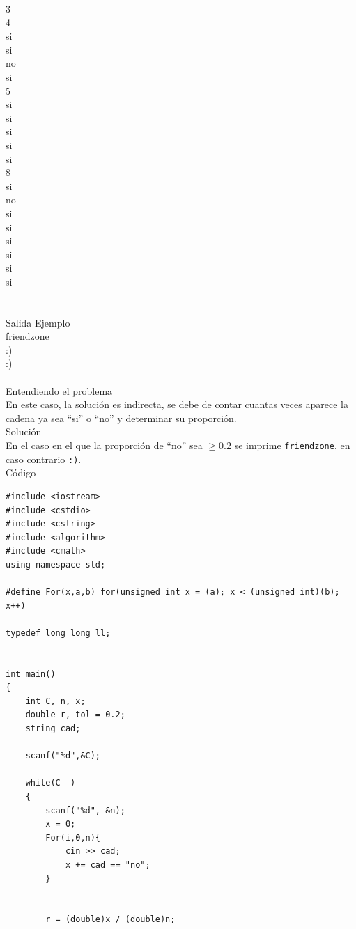 \documentclass[12pt]{article}
\begin{document}
{{{3\\
4\\
si\\
si\\
no\\
si\\
5\\
si\\
si\\
si\\
si\\
si\\
8\\
si\\
no\\
si\\
si\\
si\\
si\\
si\\
si\\
\\
\\
\textrm{\large Salida Ejemplo}
\\
friendzone\\
:)\\
:)\\
\\
\textrm{\large Entendiendo el problema}\\
En este caso, la solución es indirecta, se debe de contar cuantas veces aparece la cadena ya sea ``si'' o ``no'' y determinar su proporción.
\\
\textrm{\large Solución}\\
En el caso en el que la proporción de ``no'' sea $\geq 0{.}2$ se imprime \texttt{friendzone}, en caso contrario \texttt{:)}.
\\
\textrm{\large Código}\\
\begin{verbatim}
#include <iostream>
#include <cstdio>
#include <cstring>
#include <algorithm>
#include <cmath>
using namespace std;

#define For(x,a,b) for(unsigned int x = (a); x < (unsigned int)(b); x++)

typedef long long ll;


int main()
{
	int C, n, x;
	double r, tol = 0.2;
	string cad;

	scanf("%d",&C);

	while(C--)
	{
		scanf("%d", &n);
		x = 0;
		For(i,0,n){
			cin >> cad;
			x += cad == "no";
		}


		r = (double)x / (double)n;


\end{verbatim}}}}
\end{document}
